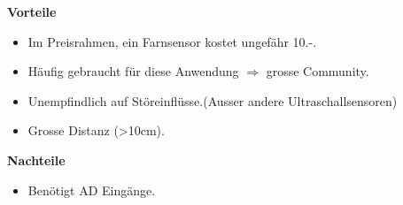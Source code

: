 \textbf {Vorteile}
\begin{itemize}
\item Im Preisrahmen, ein Farnsensor kostet ungefähr 10.-.
\item Häufig gebraucht für diese Anwendung $\Rightarrow$ grosse Community.
\item Unempfindlich auf Störeinflüsse.(Ausser andere Ultraschallsensoren)
\item Grosse Distanz (>10cm).\\
\end{itemize}
\textbf {Nachteile}
\begin{itemize}
\item Benötigt  AD Eingänge.
\end{itemize}